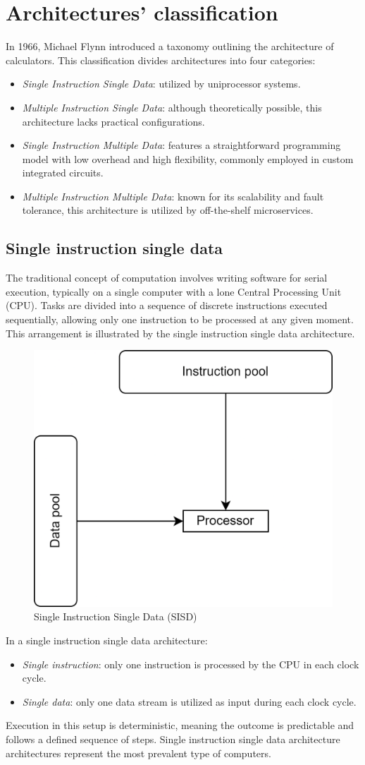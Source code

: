 \section{Architectures' classification}

In 1966, Michael Flynn introduced a taxonomy outlining the architecture of calculators. 
This classification divides architectures into four categories:
\begin{itemize}
    \item \textit{Single Instruction Single Data}: utilized by uniprocessor systems.
    \item \textit{Multiple Instruction Single Data}: although theoretically possible, this architecture lacks practical configurations.
    \item \textit{Single Instruction Multiple Data}: features a straightforward programming model with low overhead and high flexibility, commonly employed in custom integrated circuits.
    \item \textit{Multiple Instruction Multiple Data}: known for its scalability and fault tolerance, this architecture is utilized by off-the-shelf microservices.
\end{itemize}

\subsection{Single instruction single data}
The traditional concept of computation involves writing software for serial execution, typically on a single computer with a lone Central Processing Unit (CPU).
Tasks are divided into a sequence of discrete instructions executed sequentially, allowing only one instruction to be processed at any given moment.
This arrangement is illustrated by the single instruction single data architecture.

\begin{figure}[H]
    \centering
    \includegraphics[width=0.3\linewidth]{images/sisd.png}
    \caption{Single Instruction Single Data (SISD)}
\end{figure}

In a single instruction single data architecture: 
\begin{itemize}
    \item \textit{Single instruction}: only one instruction is processed by the CPU in each clock cycle.
    \item \textit{Single data}: only one data stream is utilized as input during each clock cycle.
\end{itemize}
Execution in this setup is deterministic, meaning the outcome is predictable and follows a defined sequence of steps. 
Single instruction single data architecture architectures represent the most prevalent type of computers.

